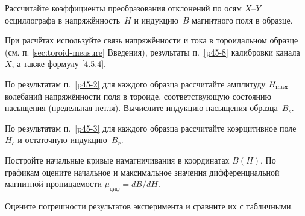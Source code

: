 \begin{lab:task}
\item Рассчитайте коэффициенты преобразования отклонений по осям
$X$--$Y$ осциллографа в напряжённость~$H$ и индукцию~$B$ магнитного поля
в образце.

При расчётах используйте связь напряжённости и тока в тороидальном образце
(см. п. \ref{sec:toroid-measure} Введения), результаты п.~\ref{p45-8} 
калибровки канала~$X$, а также формулу \eqref{4.5.4}.

\item 
По результатам п.~\ref{p45-2} для каждого образца рассчитайте 
амплитуду $H_{\rm max}$ колебаний напряжённости поля в тороиде, 
соответствующую состоянию насыщения (предельная петля).
Вычислите индукцию насыщения образца~$B_s$.

\item По результатам п.~\ref{p45-3} для каждого образца
рассчитайте коэрцитивное поле~$H_c$ и остаточную индукцию~$B_r$.

\item Постройте начальные кривые намагничивания в координатах $B(H)$.
По графикам оцените начальное и максимальное значения дифференциальной
магнитной проницаемости $\mu_\text{диф}=dB/dH$.

\item Оцените погрешности результатов эксперимента 
и сравните их с табличными.
\end{lab:task}

